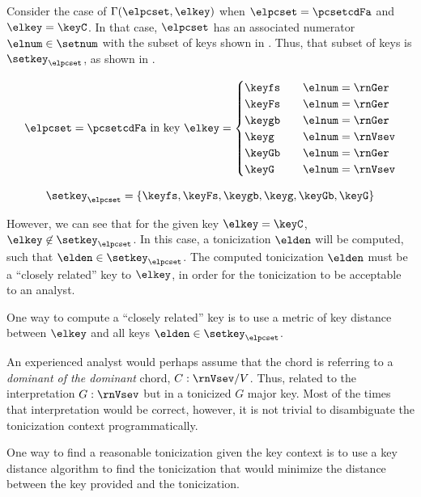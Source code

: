 
Consider the case of $\Gamma(\elpcset, \elkey)$ when
$\elpcset = \pcsetcdFa$ and $\elkey = \keyC$. In that case,
$\elpcset$ has an associated numerator $\elnum \in \setnum$
with the subset of keys shown in .
Thus, that subset of keys is $\setkey_\elpcset$, as shown in
. 

\begin{equation}
    \label{eq:key_not_found}
    \elpcset = \pcsetcdFa \text{ in key } \elkey =
    \begin{cases}
        \keyfs & \quad \elnum = \rnGer \\
        \keyFs & \quad \elnum = \rnGer \\
        \keygb & \quad \elnum = \rnGer \\
        \keyg  & \quad \elnum = \rnVsev \\
        \keyGb & \quad \elnum = \rnGer \\
        \keyG  & \quad \elnum = \rnVsev \\
    \end{cases}
\end{equation}

\begin{equation}
    \label{eq:key_not_found2}
    \setkey_\elpcset = \{ \keyfs, \keyFs, \keygb, \keyg, \keyGb, \keyG \}
\end{equation}

However, we can see that for the given key $\elkey = \keyC$,
$\elkey \not\in \setkey_\elpcset$. In this case, a
tonicization $\elden$ will be computed, such that $\elden
\in \setkey_\elpcset$. The computed tonicization $\elden$
must be a ``closely related'' key to $\elkey$, in order for
the tonicization to be acceptable to an analyst.

One way to compute a ``closely related'' key is to use a
metric of key distance between $\elkey$ and all keys $\elden
\in \setkey_\elpcset$.


An experienced analyst would perhaps assume that the chord
is referring to a \emph{dominant of the dominant} chord,
$C:\rnVsev/V$. Thus, related to the interpretation
$G:\rnVsev$ but in a tonicized $G$ major key. Most of the
times that interpretation would be correct, however, it is
not trivial to disambiguate the tonicization context
programmatically.

One way to find a reasonable tonicization given the key
context is to use a key distance algorithm to find the
tonicization that would minimize the distance between the
key provided and the tonicization.
